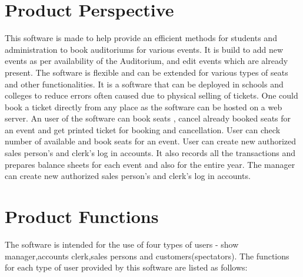 \documentclass{scrreprt}
\begin{document}
\section{Product Perspective}
This software is made to help provide an efficient methods for students and administration to book auditoriums for various events. It is build to add new events as per availability of the Auditorium, and edit events which are already present. The software is flexible and can be extended for various types of seats and other functionalities. It is a software that can be deployed in schools and colleges to reduce errors often caused due to physical selling of tickets. One could book a ticket directly from any place as the software can be hosted on a web server. An user of the software can book seats , cancel already booked seats for an event and get printed ticket for booking and cancellation. User can check number of available and book seats for an event. User can create new authorized sales person’s and clerk’s log in accounts. It also records all the transactions and prepares balance sheets for each event and also for the entire year. The manager can create new authorized sales person’s and clerk’s log in accounts.


\section{Product Functions}

The software is intended for the use of four types of users - show manager,accounts clerk,sales persons and customers(spectators). The functions for each type of user provided by this software are listed as follows:
\end{document}
